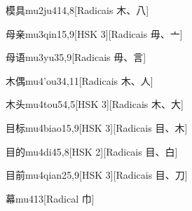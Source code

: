 \begin{entry}{模具}{mu2ju4}{14,8}[Radicais ⽊、⼋]
\end{entry}

\begin{entry}{母亲}{mu3qin1}{5,9}[HSK 3][Radicais ⽏、⼇]
\end{entry}

\begin{entry}{母语}{mu3yu3}{5,9}[Radicais ⽏、⾔]
\end{entry}

\begin{entry}{木偶}{mu4'ou3}{4,11}[Radicais ⽊、⼈]
\end{entry}

\begin{entry}{木头}{mu4tou5}{4,5}[HSK 3][Radicais ⽊、⼤]
\end{entry}

\begin{entry}{目标}{mu4biao1}{5,9}[HSK 3][Radicais ⽬、⽊]
\end{entry}

\begin{entry}{目的}{mu4di4}{5,8}[HSK 2][Radicais ⽬、⽩]
\end{entry}

\begin{entry}{目前}{mu4qian2}{5,9}[HSK 3][Radicais ⽬、⼑]
\end{entry}

\begin{entry}{幕}{mu4}{13}[Radical ⼱]
\end{entry}


